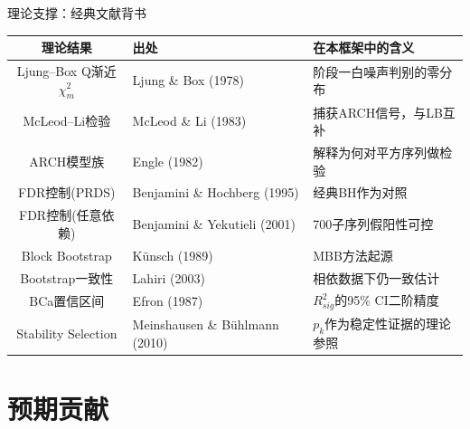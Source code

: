 \documentclass{beamer}
\begin{document}
\begin{frame}{理论支撑：经典文献背书}
    \begin{table}
        \centering
        \footnotesize
        \begin{tabular}{cll}
            \toprule
            理论结果 & 出处 & 在本框架中的含义 \\
            \midrule
            Ljung--Box Q渐近$\chi^2_m$ & Ljung \& Box (1978) & 阶段一白噪声判别的零分布 \\
            McLeod--Li检验 & McLeod \& Li (1983) & 捕获ARCH信号，与LB互补 \\
            ARCH模型族 & Engle (1982) & 解释为何对平方序列做检验 \\
            FDR控制(PRDS) & Benjamini \& Hochberg (1995) & 经典BH作为对照 \\
            FDR控制(任意依赖) & Benjamini \& Yekutieli (2001) & 700子序列假阳性可控 \\
            Block Bootstrap & Künsch (1989) & MBB方法起源 \\
            Bootstrap一致性 & Lahiri (2003) & 相依数据下仍一致估计 \\
            BCa置信区间 & Efron (1987) & $R^2_{sig}$的95\% CI二阶精度 \\
            Stability Selection & Meinshausen \& Bühlmann (2010) & $p_k$作为稳定性证据的理论参照 \\
            \bottomrule
        \end{tabular}
    \end{table}
\end{frame}

\section{预期贡献}
\end{document}
